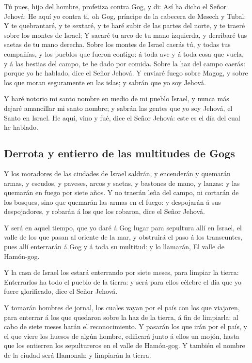  Tú pues, hijo del hombre, profetiza contra Gog, y di: Así
ha dicho el Señor Jehová: He aquí yo contra ti, oh Gog, príncipe de la
cabecera de Mesech y Tubal:  Y te quebrantaré, y te sextaré,
y te haré subir de las partes del norte, y te traeré sobre los montes de
Israel;  Y sacaré tu arco de tu mano izquierda, y derribaré
tus saetas de tu mano derecha.  Sobre los montes de Israel
caerás tú, y todas tus compañías, y los pueblos que fueron contigo: á
toda ave y á toda cosa que vuela, y á las bestias del campo, te he dado
por comida.  Sobre la haz del campo caerás: porque yo he
hablado, dice el Señor Jehová.  Y enviaré fuego sobre Magog,
y sobre los que moran seguramente en las islas; y sabrán que yo soy
Jehová.

 Y haré notorio mi santo nombre en medio de mi pueblo
Israel, y nunca más dejaré amancillar mi santo nombre; y sabrán las
gentes que yo soy Jehová, el Santo en Israel.  He aquí, vino
y fué, dice el Señor Jehová: este es el día del cual he hablado.

\hypertarget{derrota-y-entierro-de-las-multitudes-de-gogs}{%
\subsection{Derrota y entierro de las multitudes de
Gogs}\label{derrota-y-entierro-de-las-multitudes-de-gogs}}

 Y los moradores de las ciudades de Israel saldrán, y
encenderán y quemarán armas, y escudos, y paveses, arcos y saetas, y
bastones de mano, y lanzas: y las quemarán en fuego por siete años.
 Y no traerán leña del campo, ni cortarán de los bosques,
sino que quemarán las armas en el fuego: y despojarán á sus
despojadores, y robarán á los que los robaron, dice el Señor Jehová.

 Y será en aquel tiempo, que yo daré á Gog lugar para
sepultura allí en Israel, el valle de los que pasan al oriente de la
mar, y obstruirá el paso á los transeuntes, pues allí enterrarán á Gog y
á toda su multitud: y lo llamarán, El valle de Hamón-gog.

 Y la casa de Israel los estará enterrando por siete meses,
para limpiar la tierra:  Enterrarlos ha todo el pueblo de
la tierra: y será para ellos célebre el día que yo fuere glorificado,
dice el Señor Jehová.

 Y tomarán hombres de jornal, los cuales vayan por el país
con los que viajaren, para enterrar á los que quedaron sobre la haz de
la tierra, á fin de limpiarla: al cabo de siete meses harán el
reconocimiento.  Y pasarán los que irán por el país, y el
que viere los huesos de algún hombre, edificará junto á ellos un mojón,
hasta que los entierren los sepultureros en el valle de Hamón-gog.
 Y también el nombre de la ciudad será Hamonah: y limpiarán
la tierra.

